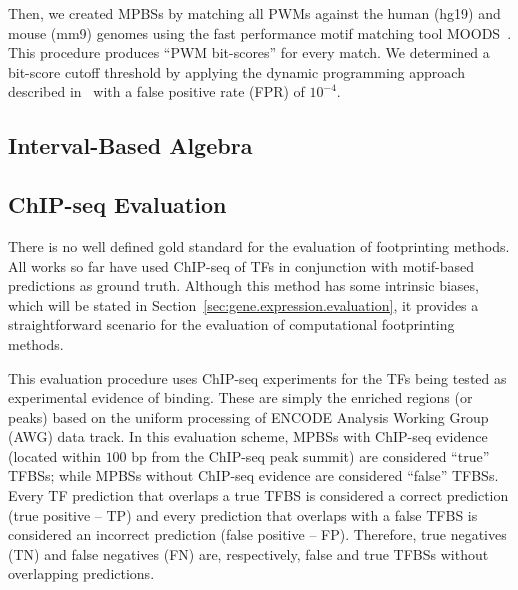 Then, we created MPBSs by matching all PWMs against the human (hg19) and mouse (mm9) genomes using the fast performance motif matching tool MOODS~\cite{korhonen2009}. This procedure produces ``PWM bit-scores'' for every match. We determined a bit-score cutoff threshold by applying the dynamic programming approach described in~\cite{wilczynski2009} with a false positive rate (FPR) of $10^{-4}$.


\subsection{Interval-Based Algebra}
\label{sec:interval.based.algebra}


\subsection{ChIP-seq Evaluation}
\label{sec:chipseq.evaluation}

There is no well defined gold standard for the evaluation of footprinting methods. All works so far have used ChIP-seq of TFs in conjunction with motif-based predictions as ground truth. Although this method has some intrinsic biases, which will be stated in Section~\ref{sec:gene.expression.evaluation}, it provides a straightforward scenario for the evaluation of computational footprinting methods.

This evaluation procedure uses ChIP-seq experiments for the TFs being tested as experimental evidence of binding. These are simply the enriched regions (or peaks) based on the uniform processing of ENCODE Analysis Working Group (AWG) data track. In this evaluation scheme, MPBSs with ChIP-seq evidence (located within $100$ bp from the ChIP-seq peak summit) are considered ``true'' TFBSs; while MPBSs without ChIP-seq evidence are considered ``false'' TFBSs. Every TF prediction that overlaps a true TFBS is considered a correct prediction (true positive -- TP) and every prediction that overlaps with a false TFBS is considered an incorrect prediction (false positive -- FP). Therefore, true negatives (TN) and false negatives (FN) are, respectively, false and true TFBSs without overlapping predictions.

